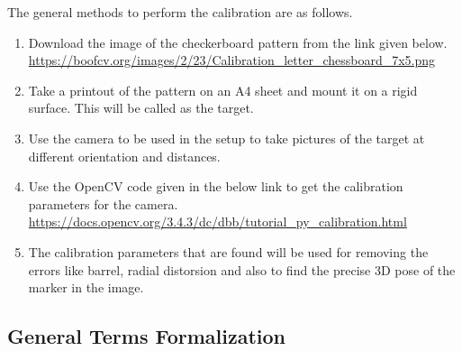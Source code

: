 \documentclass[10pt,a4paper]{article}
\begin{document}
The general methods to perform the calibration are as follows.

\begin{enumerate}
	\item
	Download the image of the checkerboard pattern from the link given below.
	\href{https://boofcv.org/images/2/23/Calibration_letter_chessboard_7x5.png}{https://boofcv.org/images/2/23/Calibration\_letter\_chessboard\_7x5.png}
	
	\item
	Take a printout of the pattern on an A4 sheet and mount it on a rigid surface. This will be called as the target.
	
	\item
	Use the camera to be used in the setup to take pictures of the target at different orientation and distances.
	
	\item
	Use the OpenCV code given in the below link to get the calibration parameters for the camera. 
	\href{https://docs.opencv.org/3.4.3/dc/dbb/tutorial_py_calibration.html}{https://docs.opencv.org/3.4.3/dc/dbb/tutorial\_py\_calibration.html}
	
	\item
	The calibration parameters that are found will be used for removing the errors like barrel, radial distorsion and also to find the precise 3D pose of the marker in the image.


\end{enumerate}

\subsection{General Terms Formalization}
\end{document}
